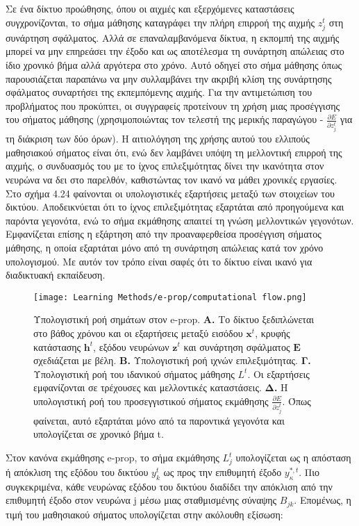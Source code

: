 \documentclass[12pt]{report}
\begin{document}
Σε ένα δίκτυο προώθησης, όπου οι αιχμές και εξερχόμενες καταστάσεις συγχρονίζονται, το σήμα μάθησης καταγράφει την πλήρη επιρροή της αιχμής \(z_j^t\) στη συνάρτηση σφάλματος. Αλλά σε επαναλαμβανόμενα δίκτυα, η εκπομπή της αιχμής μπορεί να μην επηρεάσει την έξοδο και ως αποτέλεσμα τη συνάρτηση απώλειας στο ίδιο χρονικό βήμα αλλά αργότερα στο χρόνο. Αυτό οδηγεί στο σήμα μάθησης όπως παρουσιάζεται παραπάνω να μην συλλαμβάνει την ακριβή κλίση της συνάρτησης σφάλματος συναρτήσει της εκπεμπόμενης αιχμής. Για την αντιμετώπιση του προβλήματος που προκύπτει, οι συγγραφείς προτείνουν τη χρήση μιας προσέγγισης του σήματος μάθησης (χρησιμοποιώντας τον τελεστή της μερικής παραγώγου - \(\frac{\partial E}{\partial z_{j}^{t}}\) για τη διάκριση των δύο όρων). Η αιτιολόγηση της χρήσης αυτού του ελλιπούς μαθησιακού σήματος είναι ότι, ενώ δεν λαμβάνει υπόψη τη μελλοντική επιρροή της αιχμής, ο συνδυασμός του με το ίχνος επιλεξιμότητας δίνει την ικανότητα στον νευρώνα να δει στο παρελθόν, καθιστώντας τον ικανό να μάθει χρονικές εργασίες. Στο σχήμα 4.24 φαίνονται οι υπολογιστικές εξαρτήσεις μεταξύ των στοιχείων του δικτύου. Αποδεικνύεται ότι το ίχνος επιλεξιμότητας εξαρτάται από προηγούμενα και παρόντα γεγονότα, ενώ το σήμα εκμάθησης απαιτεί τη γνώση μελλοντικών γεγονότων. Εμφανίζεται επίσης η εξάρτηση από την προαναφερθείσα προσέγγιση σήματος μάθησης, η οποία εξαρτάται μόνο από τη συνάρτηση απώλειας κατά τον χρόνο υπολογισμού. Με αυτόν τον τρόπο είναι σαφές ότι το δίκτυο είναι ικανό για διαδικτυακή εκπαίδευση.

\begin{figure}[htp]
    \centering
    \texttt{[image: Learning Methods/e-prop/computational flow.png]}
    \caption{\footnotesize Υπολογιστική ροή σημάτων στον \textlatin{e-prop}. \textbf{Α. } Το δίκτυο ξεδιπλώνεται στο βάθος χρόνου και οι εξαρτήσεις μεταξύ εισόδου \(\textbf{x}^t\), κρυφής κατάστασης \(\textbf{h}^t\), εξόδου νευρώνων \(\textbf{z}^t\) και συνάρτηση σφάλματος \(\textbf{E}\) σχεδιάζεται με βέλη. \textbf{Β. } Υπολογιστική ροή ιχνών επιλεξιμότητας. \textbf{Γ. } Υπολογιστική ροή του ιδανικού σήματος μάθησης \(L^t\). Οι εξαρτήσεις εμφανίζονται σε τρέχουσες και μελλοντικές καταστάσεις. \textbf {Δ. } Η υπολογιστική ροή του προσεγγιστικού σήματος εκμάθησης \(\frac{\partial E}{\partial z_ {j}^{t}}\). Όπως φαίνεται, αυτό εξαρτάται μόνο από τα παροντικά γεγονότα και υπολογίζεται σε χρονικό βήμα \textlatin{t}.
    \label{fig:readout}}
\end{figure}

Στον κανόνα εκμάθησης \textlatin{e-prop}, το σήμα εκμάθησης \(L_j^t\) υπολογίζεται ως η απόσταση ή απόκλιση της εξόδου του δικτύου \(y^t_k\) ως προς την επιθυμητή έξοδο \(y^{*, t}_κ\). Πιο συγκεκριμένα, κάθε νευρώνας εξόδου του δικτύου διαδίδει την απόκλιση από την επιθυμητή έξοδο στον νευρώνα \textlatin{j} μέσω μιας σταθμισμένης σύναψης \(B_{jk}\). Επομένως, η τιμή του μαθησιακού σήματος υπολογίζεται στην ακόλουθη εξίσωση:
\end{document}
